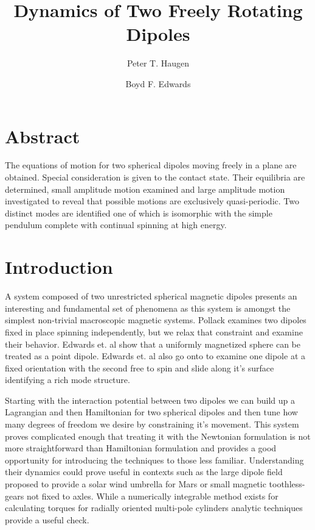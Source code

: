 \documentclass[prbg,preprint]{revtex4-1}
\begin{document}
\title{Dynamics of Two Freely Rotating Dipoles}
\author{Peter T. Haugen}
\author{Boyd F. Edwards}
\maketitle

\section{Abstract}
	The equations of motion for two spherical dipoles moving freely in a plane are obtained. Special consideration is given to the contact state. Their equilibria are determined, small amplitude motion examined and large amplitude motion investigated to reveal that possible motions are exclusively quasi-periodic.
	Two distinct modes are identified one of which is isomorphic with the simple pendulum complete with continual spinning at high energy.
	
\section{Introduction}
A system composed of two unrestricted spherical magnetic dipoles presents an interesting and fundamental set of phenomena as this system is amongst the simplest non-trivial macroscopic magnetic systems. Pollack \cite{doi:10.1139/p96-151} examines two dipoles fixed in place spinning independently, but we relax that constraint and examine their behavior. Edwards et. al \cite{Edwards:2017aa} show that a uniformly magnetized sphere can be treated as a point dipole. Edwards et. al  \cite{Edwards:2017ab} also go onto to examine one dipole at a fixed orientation with the second free to spin and slide along it's surface identifying a rich mode structure.

Starting with the interaction potential between two dipoles we can build up a Lagrangian and then Hamiltonian for two spherical dipoles and then tune how many degrees of freedom we desire by constraining it's movement. This system proves complicated enough that treating it with the Newtonian formulation is not more straightforward than Hamiltonian formulation and provides a good opportunity for introducing the techniques to those less familiar.
Understanding their dynamics could prove useful in contexts such as the large dipole field proposed to provide a solar wind umbrella for Mars \cite{2017LPICo1989.8250G} or small magnetic toothless-gears \cite{doi:10.1119/1.5029823} not fixed to axles.
While a numerically integrable method exists for calculating torques for radially oriented multi-pole cylinders \cite{Furlani:1995aa}  analytic techniques provide a useful check.
\end{document}
